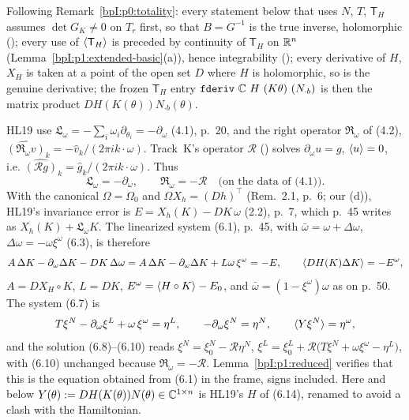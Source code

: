 \begin{remark}\label{bpI:p1:totality}
Following Remark~\ref{bpI:p0:totality}: every statement below that uses $N$, $T$, $\mathsf T_H$ assumes
$\det G_K\ne0$ on $T_r$ first, so that $B=G^{-1}$ is the true inverse, holomorphic
(); every use of $\langle \mathsf T_H\rangle$ is preceded by continuity of
$\mathsf T_H$ on $\mathbb{R}^n$ (Lemma~\ref{bpI:p1:extended-basic}(a)), hence integrability
(); every derivative of $H$, $X_H$ is taken at a point of the open set $D$ where $H$ is
holomorphic, so  is the genuine derivative; the frozen $\mathsf T_H$ entry
$\Lean{fderiv}\ \C\ H\ (K\theta)\ (N_{\cdot b})$ is then the matrix product $DH(K(\theta))N_{\cdot b}(\theta)$.
\end{remark}

\begin{remark}\label{bpI:p1:signs}
HL19 use $\mathfrak L_\omega=-\sum_i\omega_i\partial_{\theta_i}=-\partial_\omega$ (4.1), p.~20, and the
right operator $\mathfrak R_\omega$ of (4.2), $\widehat{(\mathfrak R_\omega v)}_k=-\hat v_k/(2\pi ik\cdot\omega)$. Track~K's operator
$\mathcal R$ () solves $\partial_\omega u=g$, $\langle u\rangle=0$, i.e.
$\widehat{(\mathcal Rg)}_k=\hat g_k/(2\pi ik\cdot\omega)$. Thus
\[
\mathfrak L_\omega=-\partial_\omega,\qquad\mathfrak R_\omega=-\mathcal R\quad\text{(on the data of (4.1))}.
\]
With the canonical $\Omega=\Omega_0$ and $\Omega X_h=(Dh)^\top$ (Rem.~2.1, p.~6; our
(d)), HL19's invariance error is $E=X_h(K)-DK\,\omega$ (2.2), p.~7, which p.~45 writes as
$X_h(K)+\mathfrak L_\omega K$. The linearized system (6.1), p.~45, with $\bar\omega=\omega+\Delta\omega$,
$\Delta\omega=-\omega\xi^\omega$ (6.3), is therefore
\[
A\,\Delta K-\partial_\omega\Delta K-DK\,\Delta\omega=A\,\Delta K-\partial_\omega\Delta K+L\omega\,\xi^\omega=-E,
\qquad\langle DH(K)\Delta K\rangle=-E^\omega,
\]
$A=DX_H\circ K$, $L=DK$, $E^\omega=\langle H\circ K\rangle-E_0$, and $\bar\omega=(1-\xi^\omega)\omega$ as on p.~50. The system (6.7) is
\[
T\xi^N-\partial_\omega\xi^L+\omega\,\xi^\omega=\eta^L,\qquad-\partial_\omega\xi^N=\eta^N,\qquad\langle Y\xi^N\rangle=\eta^\omega,
\]
and the solution (6.8)--(6.10) reads $\xi^N=\xi^N_0-\mathcal R\eta^N$, $\xi^L=\xi^L_0+\mathcal R\bigl(T\xi^N+\omega\xi^\omega-\eta^L\bigr)$,
with (6.10) unchanged because $\mathfrak R_\omega=-\mathcal R$. Lemma~\ref{bpI:p1:reduced} verifies that this is the
equation obtained from (6.1) in the frame, signs included. Here and below $Y(\theta):=DH(K(\theta))N(\theta)\in\mathbb{C}^{1\times n}$ is HL19's
$H$ of (6.14), renamed to avoid a clash with the Hamiltonian.
\end{remark}

